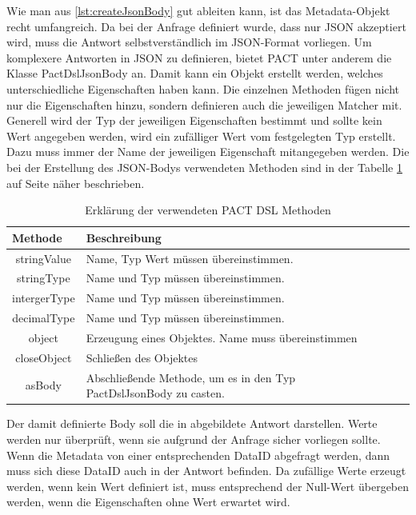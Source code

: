 \documentclass{llncs}
\begin{document}
Wie man aus \ref{lst:createJsonBody} gut ableiten kann, ist das Metadata-Objekt recht umfangreich. Da bei der Anfrage definiert wurde, dass nur JSON akzeptiert wird, muss die Antwort selbstverständlich im JSON-Format vorliegen. Um komplexere Antworten in JSON zu definieren, bietet PACT unter anderem die Klasse PactDslJsonBody an. Damit kann ein Objekt erstellt werden, welches unterschiedliche Eigenschaften haben kann. Die einzelnen Methoden fügen nicht nur die Eigenschaften hinzu, sondern definieren auch die jeweiligen Matcher mit. Generell wird der Typ der jeweiligen Eigenschaften bestimmt und sollte kein Wert angegeben werden, wird ein zufälliger Wert vom festgelegten Typ erstellt. Dazu muss immer der Name der jeweiligen Eigenschaft mitangegeben werden. Die bei der Erstellung des JSON-Bodys verwendeten Methoden sind in der Tabelle \ref{tab:Methoden_jsonBody} auf Seite \pageref{tab:Methoden_jsonBody} näher beschrieben.

\begin{table}[htbp]
\centering
\begin{tabular}{|c|l|p{4cm}|p{4cm}|}
\hline
\multicolumn{1}{|l|}{Methode} & Beschreibung \\ \hline
stringValue & Name, Typ Wert müssen übereinstimmen. \\ \hline
stringType & Name und Typ müssen übereinstimmen. \\ \hline
intergerType & Name und Typ müssen übereinstimmen. \\ \hline
decimalType & Name und Typ müssen übereinstimmen. \\ \hline
object & Erzeugung eines Objektes. Name muss übereinstimmen  \\ \hline
closeObject & Schließen des Objektes\\ \hline
asBody & Abschließende Methode, um es in den Typ PactDslJsonBody zu casten. \\ \hline
\end{tabular}
\caption{Erklärung der verwendeten PACT DSL Methoden}
\label{tab:Methoden_jsonBody}
\end{table}

Der damit definierte Body soll die in abgebildete Antwort darstellen. Werte werden nur überprüft, wenn sie aufgrund der Anfrage sicher vorliegen sollte. Wenn die Metadata von einer entsprechenden DataID abgefragt werden, dann muss sich diese DataID auch in der Antwort befinden. Da zufällige Werte erzeugt werden, wenn kein Wert definiert ist, muss entsprechend der Null-Wert übergeben werden, wenn die Eigenschaften ohne Wert erwartet wird.
\end{document}
